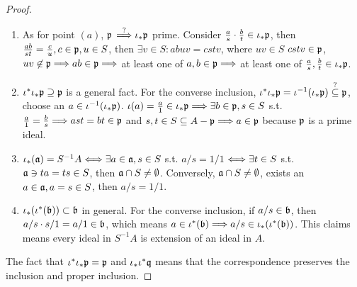 \documentclass[11pt,fleqn]{book}
\begin{document}
\begin{proof}
\begin{enumerate}[label=(\alph*)]
\item 
 As for point $(a)$, ${\mathfrak p}$  $\overset{?}{\Longrightarrow}\iota_*{\mathfrak p}$ prime. Consider $\frac{a}{s}\cdot \frac{b}{t}\in \iota_*{\mathfrak p}$, then $\frac{ab}{st}=\frac{c}{u},c\in{\mathfrak p}, u\in S$, then $\exists v\in S:abuv=cstv$, where $uv\in S$ $cstv\in{\mathfrak p}$, $uv\not\in {\mathfrak p}\Longrightarrow ab\in{\mathfrak p}\Longrightarrow$ at least one of $a, b\in{\mathfrak p}\Longrightarrow$ at least one of $\frac{a}{s},\frac{b}{t}\in \iota_*{\mathfrak p}$.
\item 
 $\iota^*\iota_*{\mathfrak p}\supseteq{\mathfrak p}$ is a general fact.
 For the converse inclusion, $\iota^*\iota_*{\mathfrak p}=\iota^{-1}(\iota_*{\mathfrak p})\overset{?}{\subseteq}{\mathfrak p}$, choose an $a\in \iota^{-1}(\iota_*{\mathfrak p})$. $\iota(a)=\frac{a}{1}\in\iota_*{\mathfrak p}\Longrightarrow\exists b\in {\mathfrak p}, s\in S$ s.t. $\frac{a}{1}=\frac{b}{s}\Longrightarrow ast=bt\in {\mathfrak p}$ and $s,t \in S\subseteq {A}-{\mathfrak p}\Longrightarrow a\in {\mathfrak p}$ because ${\mathfrak p}$ is a prime ideal.
\item
 $\iota_*({\mathfrak a})=S^{-1}{A}\Longleftrightarrow \exists a\in {\mathfrak a}, s\in S$ s.t. $a/s=1/1$
$\Longleftrightarrow\exists t\in S$ s.t. ${\mathfrak a}\ni ta=ts\in S$, then ${\mathfrak a}\cap S\neq\emptyset$. Conversely, ${\mathfrak a}\cap S\neq \emptyset$, exists an $a\in {\mathfrak a}, a=s\in S$, then $a/s=1/1$. 
\item 
$\iota_*(\iota^*({\mathfrak b}))\subset {\mathfrak b}$ in general. For the converse inclusion, if $a/s\in {\mathfrak b}$, then $a/s\cdot s/1=a/1\in{\mathfrak b}$, which means $a\in \iota^{*}({\mathfrak b})\Longrightarrow a/s\in \iota_{*}(\iota^*({\mathfrak b}))$. This claims means every ideal in $S^{-1}{A}$ is extension of an ideal in ${A}$. 
\end{enumerate}
The fact that $\iota^*\iota_*{\mathfrak p}={\mathfrak p}$ and $\iota_*\iota^*\mathfrak q$ means that the correspondence preserves the inclusion and proper inclusion.
\end{proof}
\end{document}
